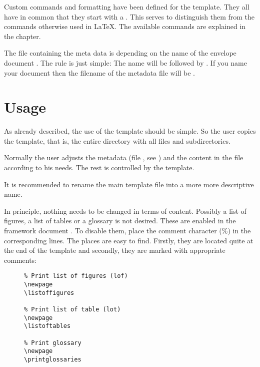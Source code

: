 Custom commands and formatting have been defined for the template. They all
have in common that they start with a .
This serves to distinguish them from the commands otherwise used in \LaTeX{}.
The available commands are explained in the  chapter.
\bigbreak

 The file containing the meta data is depending on the name
of the envelope document . The rule is just simple:
The name will be  followed by .
If you name your document  then the filename of the
metadata file will be .

\section{Usage}

As already described, the use of the template should be simple. So the user
copies the template, that is, the entire directory with all files and
subdirectories.
\bigbreak

Normally the user adjusts the metadata (file ,
see ) and the content in the file
 according to his needs. The rest is controlled
by the template.
\bigbreak

It is recommended to rename the main template file 
into a more more descriptive name.


In principle, nothing needs to be changed in terms of content. Possibly a
list of figures, a list of tables or a glossary is not desired. These are
enabled in the framework document . To disable
them, place the comment character (\%) in the corresponding lines. The places
are easy to find. Firstly, they are located quite at the end of the template
and secondly, they are marked with appropriate comments:

\begin{figure}[H]
    \scriptsize
    \centering
    \begin{BVerbatim}
\newpage
\listoffigures

\newpage
\listoftables

\newpage
\printglossaries
    \end{BVerbatim}
\end{figure}

